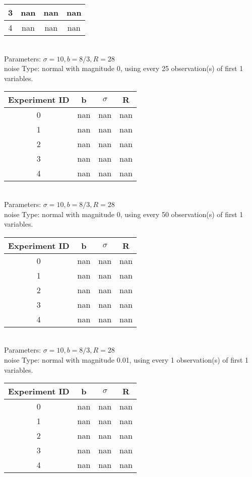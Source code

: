 \begin{multicols}{3}
\begin{tabular}{cccc}
 3 & nan & nan & nan\\ \hline 
 4 & nan & nan & nan\\ \hline 
 \end{tabular}\\
Parameters: $\sigma=10, b=8/3, R=28$\\
noise Type: normal with magnitude 0, using every 25 observation(s) of first 1 variables.\\
\begin{tabular}{cccc}
\hline Experiment ID & b & $\sigma$ & R \\ \hline 
0 & nan & nan & nan\\ \hline 
 1 & nan & nan & nan\\ \hline 
 2 & nan & nan & nan\\ \hline 
 3 & nan & nan & nan\\ \hline 
 4 & nan & nan & nan\\ \hline 
 \end{tabular}\\
Parameters: $\sigma=10, b=8/3, R=28$\\
noise Type: normal with magnitude 0, using every 50 observation(s) of first 1 variables.\\
\begin{tabular}{cccc}
\hline Experiment ID & b & $\sigma$ & R \\ \hline 
0 & nan & nan & nan\\ \hline 
 1 & nan & nan & nan\\ \hline 
 2 & nan & nan & nan\\ \hline 
 3 & nan & nan & nan\\ \hline 
 4 & nan & nan & nan\\ \hline 
 \end{tabular}\\
Parameters: $\sigma=10, b=8/3, R=28$\\
noise Type: normal with magnitude 0.01, using every 1 observation(s) of first 1 variables.\\
\begin{tabular}{cccc}
\hline Experiment ID & b & $\sigma$ & R \\ \hline 
0 & nan & nan & nan\\ \hline 
 1 & nan & nan & nan\\ \hline 
 2 & nan & nan & nan\\ \hline 
 3 & nan & nan & nan\\ \hline 
 4 & nan & nan & nan\\ \hline 
 \end{tabular}\\

\end{multicols}
